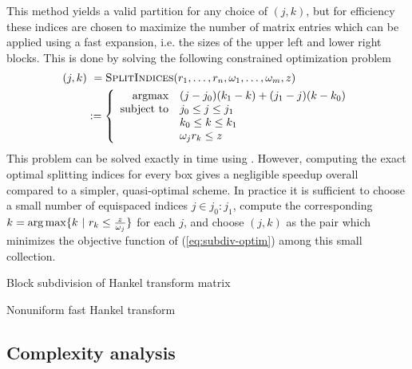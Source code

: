 This method yields a valid partition for any choice of $(j,k)$, but for
efficiency these indices are chosen to maximize the number of matrix entries
which can be applied using a fast expansion, i.e. the sizes of the upper left
and lower right blocks. This is done by solving the following constrained
optimization problem
\begin{align}
    (j,k) 
    &\ = \textsc{SplitIndices}(r_1,\dots,r_n, \omega_1,\dots,\omega_m, z) \\
    &:= \left\{
        \begin{array}{r@{\quad } l}
        \text{argmax} & (j-j_0)(k_1-k) + (j_1-j)(k-k_0)   \\
        \text{subject to} & j_0 \leq j \leq j_1 \\ 
        & k_0 \leq k \leq k_1 \\ 
        & \omega_j r_k \leq z
        \end{array}
    \right. \label{eq:subdiv-optim}
\end{align}
This problem can be solved exactly in  time
using . However, computing the exact optimal splitting indices
for every box gives a negligible speedup overall compared to a simpler,
quasi-optimal scheme. In practice it is sufficient to choose a small number of
equispaced indices $j \in j_0:j_1$, compute the corresponding $k = \operatorname*{arg\,max} \{k \
| \ r_k \leq \frac{z}{\omega_j}\}$ for each $j$, and choose $(j,k)$ as the pair
which minimizes the objective function of (\ref{eq:subdiv-optim}) among this
small collection.

\begin{algorithm2e}[t]
    \caption{Block subdivision of Hankel transform
    matrix}\label{alg:subdivision}
    
\end{algorithm2e}

\begin{algorithm2e}[t]
    \caption{Nonuniform fast Hankel transform}\label{alg:nufht}
    
\end{algorithm2e}

\subsection{Complexity analysis}

